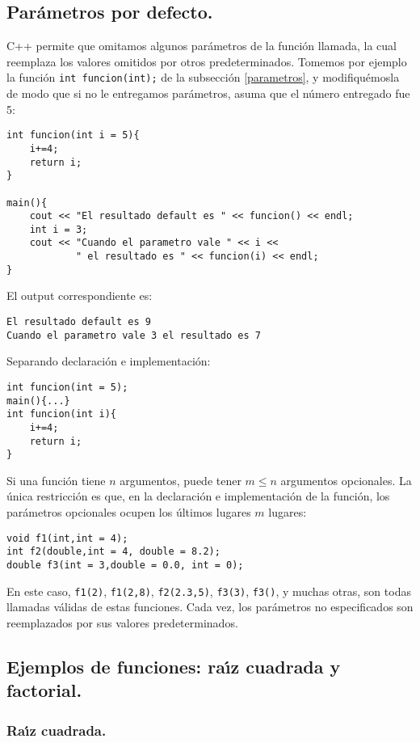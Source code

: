 \subsection{Par{\'a}metros por defecto.}

C++ permite que omitamos algunos par{\'a}metros de la funci{\'o}n
llamada, la cual reemplaza los valores omitidos por otros
predeterminados.  Tomemos por ejemplo la funci{\'o}n 
\verb+int funcion(int);+ de la
subsecci{\'o}n \ref{parametros}, y modifiqu{\'e}mosla de modo que si
no le entregamos par{\'a}metros, asuma que el n{\'u}mero entregado fue
5:
\begin{verbatim}
int funcion(int i = 5){
    i+=4;
    return i;
}

main(){
    cout << "El resultado default es " << funcion() << endl;
    int i = 3;
    cout << "Cuando el parametro vale " << i << 
            " el resultado es " << funcion(i) << endl;
}
\end{verbatim}

El output correspondiente es:

\begin{verbatim}
El resultado default es 9
Cuando el parametro vale 3 el resultado es 7
\end{verbatim}
Separando declaraci\'on e implementaci\'on:
\begin{verbatim}
int funcion(int = 5);
main(){...}
int funcion(int i){
    i+=4;
    return i;
}
\end{verbatim}


Si una funci\'on tiene $n$ argumentos, puede tener $m\leq n$
argumentos opcionales. La \'unica restricci\'on es que, en la
declaraci\'on e implementaci\'on de la funci\'on, los par\'ametros
opcionales ocupen los \'ultimos lugares $m$ lugares:
\begin{verbatim}
void f1(int,int = 4);
int f2(double,int = 4, double = 8.2);
double f3(int = 3,double = 0.0, int = 0);
\end{verbatim}
En este caso, \verb+f1(2)+, \verb+f1(2,8)+, \verb+f2(2.3,5)+,
\verb+f3(3)+, \verb+f3()+, y muchas otras, son todas llamadas
v\'alidas de estas funciones. Cada vez, los par\'ametros no
especificados son reemplazados por sus valores predeterminados.

\subsection{Ejemplos de funciones: ra\'{\i}z cuadrada y factorial.}

\subsubsection{Ra\'{\i}z cuadrada.}

